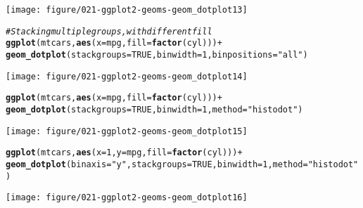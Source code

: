 \documentclass[a4paper,titlepage]{tufte-handout}\usepackage[]{graphicx}\usepackage[]{color}
\makeatletter
\def\maxwidth{ %
  \ifdim\Gin@nat@width>\linewidth
    \linewidth
  \else
    \Gin@nat@width
  \fi
}
\newcommand{\hlnum}[1]{\textcolor[rgb]{0.686,0.059,0.569}{#1}}%
\newcommand{\hlstr}[1]{\textcolor[rgb]{0.192,0.494,0.8}{#1}}%
\newcommand{\hlcom}[1]{\textcolor[rgb]{0.678,0.584,0.686}{\textit{#1}}}%
\newcommand{\hlopt}[1]{\textcolor[rgb]{0,0,0}{#1}}%
\newcommand{\hlstd}[1]{\textcolor[rgb]{0.345,0.345,0.345}{#1}}%
\newcommand{\hlkwc}[1]{\textcolor[rgb]{0.333,0.667,0.333}{#1}}%
\newcommand{\hlkwd}[1]{\textcolor[rgb]{0.737,0.353,0.396}{\textbf{#1}}}%
\newenvironment{kframe}{%
 \def\at@end@of@kframe{}%
 \ifinner\ifhmode%
  \def\at@end@of@kframe{\end{minipage}}%
  \begin{minipage}{\columnwidth}%
 \fi\fi%
 \def\FrameCommand##1{\hskip\@totalleftmargin \hskip-\fboxsep
 \colorbox{shadecolor}{##1}\hskip-\fboxsep
     \hskip-\linewidth \hskip-\@totalleftmargin \hskip\columnwidth}%
 \MakeFramed {\advance\hsize-\width
   \@totalleftmargin\z@ \linewidth\hsize
   \@setminipage}}%
 {\par\unskip\endMakeFramed%
 \at@end@of@kframe}
\newenvironment{knitrout}{}{} %
\makeatother
\begin{document}
\begin{knitrout}
\begin{kframe}
{\ttfamily\noindent\itshape\color{messagecolor}{\#\# stat\_bindot: binwidth defaulted to range/30. Use 'binwidth = x' to adjust this.}}\end{kframe}
\texttt{[image: figure/021-ggplot2-geoms-geom\_dotplot13]} 
\begin{kframe}\begin{alltt}
\hlcom{# Stacking multiple groups, with different fill}
\hlkwd{ggplot}\hlstd{(mtcars,} \hlkwd{aes}\hlstd{(}\hlkwc{x} \hlstd{= mpg,} \hlkwc{fill} \hlstd{=} \hlkwd{factor}\hlstd{(cyl)))} \hlopt{+}
  \hlkwd{geom_dotplot}\hlstd{(}\hlkwc{stackgroups} \hlstd{=} \hlnum{TRUE}\hlstd{,} \hlkwc{binwidth} \hlstd{=} \hlnum{1}\hlstd{,} \hlkwc{binpositions} \hlstd{=} \hlstr{"all"}\hlstd{)}
\end{alltt}
\end{kframe}
\texttt{[image: figure/021-ggplot2-geoms-geom\_dotplot14]} 
\begin{kframe}\begin{alltt}
\hlkwd{ggplot}\hlstd{(mtcars,} \hlkwd{aes}\hlstd{(}\hlkwc{x} \hlstd{= mpg,} \hlkwc{fill} \hlstd{=} \hlkwd{factor}\hlstd{(cyl)))} \hlopt{+}
  \hlkwd{geom_dotplot}\hlstd{(}\hlkwc{stackgroups} \hlstd{=} \hlnum{TRUE}\hlstd{,} \hlkwc{binwidth} \hlstd{=} \hlnum{1}\hlstd{,} \hlkwc{method} \hlstd{=} \hlstr{"histodot"}\hlstd{)}
\end{alltt}
\end{kframe}
\texttt{[image: figure/021-ggplot2-geoms-geom\_dotplot15]} 
\begin{kframe}\begin{alltt}
\hlkwd{ggplot}\hlstd{(mtcars,} \hlkwd{aes}\hlstd{(}\hlkwc{x} \hlstd{=} \hlnum{1}\hlstd{,} \hlkwc{y} \hlstd{= mpg,} \hlkwc{fill} \hlstd{=} \hlkwd{factor}\hlstd{(cyl)))} \hlopt{+}
  \hlkwd{geom_dotplot}\hlstd{(}\hlkwc{binaxis} \hlstd{=} \hlstr{"y"}\hlstd{,} \hlkwc{stackgroups} \hlstd{=} \hlnum{TRUE}\hlstd{,} \hlkwc{binwidth} \hlstd{=} \hlnum{1}\hlstd{,} \hlkwc{method} \hlstd{=} \hlstr{"histodot"}\hlstd{)}
\end{alltt}
\end{kframe}
\texttt{[image: figure/021-ggplot2-geoms-geom\_dotplot16]} 
\begin{kframe}\begin{alltt}


\end{alltt}
\end{kframe}
\end{knitrout}
\end{document}
